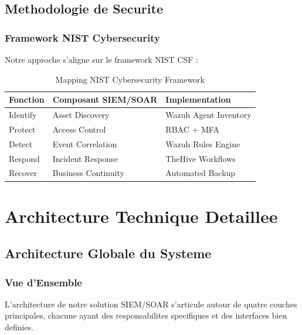 \subsection{Methodologie de Securite}


\subsubsection{Framework NIST Cybersecurity}

Notre approche s'aligne sur le framework NIST CSF :

\begin{table}[H]
    \centering
    \caption{Mapping NIST Cybersecurity Framework}
    \begin{tabular}{|l|l|l|}
        \hline
        \textbf{Fonction} & \textbf{Composant SIEM/SOAR} & \textbf{Implementation} \\
        \hline
        Identify          & Asset Discovery              & Wazuh Agent Inventory   \\
        \hline
        Protect           & Access Control               & RBAC + MFA              \\
        \hline
        Detect            & Event Correlation            & Wazuh Rules Engine      \\
        \hline
        Respond           & Incident Response            & TheHive Workflows       \\
        \hline
        Recover           & Business Continuity          & Automated Backup        \\
        \hline
    \end{tabular}
\end{table}

\section{Architecture Technique Detaillee}

\subsection{Architecture Globale du Systeme}

\subsubsection{Vue d'Ensemble}

L'architecture de notre solution SIEM/SOAR s'articule autour de quatre couches principales, chacune ayant des responsabilites specifiques et des interfaces bien definies.

